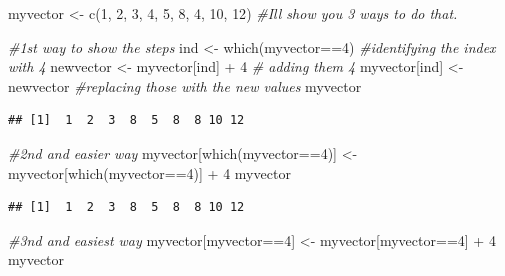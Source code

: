 \documentclass[
]{book}
\newenvironment{Shaded}{\begin{snugshade}}{\end{snugshade}}
\newcommand{\CommentTok}[1]{\textcolor[rgb]{0.56,0.35,0.01}{\textit{#1}}}
\newcommand{\DecValTok}[1]{\textcolor[rgb]{0.00,0.00,0.81}{#1}}
\newcommand{\FunctionTok}[1]{\textcolor[rgb]{0.00,0.00,0.00}{#1}}
\newcommand{\NormalTok}[1]{#1}
\newcommand{\OtherTok}[1]{\textcolor[rgb]{0.56,0.35,0.01}{#1}}
\newcommand{\SpecialCharTok}[1]{\textcolor[rgb]{0.00,0.00,0.00}{#1}}
\begin{document}
\begin{Shaded}
\begin{Highlighting}[]
\NormalTok{myvector }\OtherTok{\textless{}{-}} \FunctionTok{c}\NormalTok{(}\DecValTok{1}\NormalTok{, }\DecValTok{2}\NormalTok{, }\DecValTok{3}\NormalTok{, }\DecValTok{4}\NormalTok{, }\DecValTok{5}\NormalTok{, }\DecValTok{8}\NormalTok{, }\DecValTok{4}\NormalTok{, }\DecValTok{10}\NormalTok{, }\DecValTok{12}\NormalTok{)}
\CommentTok{\#I\textquotesingle{}ll show you 3 ways to do that.}

\CommentTok{\#1st way to show the steps}
\NormalTok{ind }\OtherTok{\textless{}{-}} \FunctionTok{which}\NormalTok{(myvector}\SpecialCharTok{==}\DecValTok{4}\NormalTok{) }\CommentTok{\#identifying the index with 4}
\NormalTok{newvector }\OtherTok{\textless{}{-}}\NormalTok{ myvector[ind] }\SpecialCharTok{+} \DecValTok{4} \CommentTok{\# adding them 4}
\NormalTok{myvector[ind] }\OtherTok{\textless{}{-}}\NormalTok{ newvector }\CommentTok{\#replacing those with the new values}
\NormalTok{myvector}
\end{Highlighting}
\end{Shaded}

\begin{verbatim}
## [1]  1  2  3  8  5  8  8 10 12
\end{verbatim}

\begin{Shaded}
\begin{Highlighting}[]
\CommentTok{\#2nd and easier way}
\NormalTok{myvector[}\FunctionTok{which}\NormalTok{(myvector}\SpecialCharTok{==}\DecValTok{4}\NormalTok{)] }\OtherTok{\textless{}{-}}\NormalTok{ myvector[}\FunctionTok{which}\NormalTok{(myvector}\SpecialCharTok{==}\DecValTok{4}\NormalTok{)] }\SpecialCharTok{+} \DecValTok{4}
\NormalTok{myvector}
\end{Highlighting}
\end{Shaded}

\begin{verbatim}
## [1]  1  2  3  8  5  8  8 10 12
\end{verbatim}

\begin{Shaded}
\begin{Highlighting}[]
\CommentTok{\#3nd and easiest way}
\NormalTok{myvector[myvector}\SpecialCharTok{==}\DecValTok{4}\NormalTok{] }\OtherTok{\textless{}{-}}\NormalTok{ myvector[myvector}\SpecialCharTok{==}\DecValTok{4}\NormalTok{] }\SpecialCharTok{+} \DecValTok{4}
\NormalTok{myvector}
\end{Highlighting}
\end{Shaded}
\end{document}

